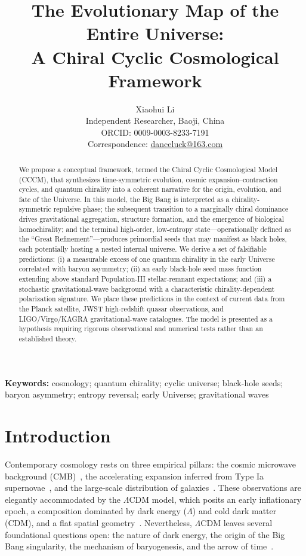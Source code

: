 \documentclass[a4paper,11pt]{article}
\title{\bfseries The Evolutionary Map of the Entire Universe:\\
A Chiral Cyclic Cosmological Framework}
\author{
    Xiaohui Li\\
    \small Independent Researcher, Baoji, China\\
    \small ORCID: 0009-0003-8233-7191\\
    \small Correspondence: \href{mailto:danceluck@163.com}{danceluck@163.com}
}
\date{}
\newcommand{\LCDM}{$\Lambda$CDM}
\newcommand{\CCCM}{CCCM}
\begin{document}
\maketitle

\begin{abstract}
\noindent
We propose a conceptual framework, termed the Chiral Cyclic Cosmological Model (\CCCM), that synthesizes time-symmetric evolution, cosmic expansion--contraction cycles, and quantum chirality into a coherent narrative for the origin, evolution, and fate of the Universe. In this model, the Big Bang is interpreted as a chirality-symmetric repulsive phase; the subsequent transition to a marginally chiral dominance drives gravitational aggregation, structure formation, and the emergence of biological homochirality; and the terminal high-order, low-entropy state---operationally defined as the ``Great Refinement''---produces primordial seeds that may manifest as black holes, each potentially hosting a nested internal universe. We derive a set of falsifiable predictions: (i) a measurable excess of one quantum chirality in the early Universe correlated with baryon asymmetry; (ii) an early black-hole seed mass function extending above standard Population-III stellar-remnant expectations; and (iii) a stochastic gravitational-wave background with a characteristic chirality-dependent polarization signature. We place these predictions in the context of current data from the Planck satellite, JWST high-redshift quasar observations, and LIGO/Virgo/KAGRA gravitational-wave catalogues. The model is presented as a hypothesis requiring rigorous observational and numerical tests rather than an established theory.
\end{abstract}

\noindent\textbf{Keywords:} cosmology; quantum chirality; cyclic universe; black-hole seeds; baryon asymmetry; entropy reversal; early Universe; gravitational waves

\section{Introduction}
\label{sec:intro}

Contemporary cosmology rests on three empirical pillars: the cosmic microwave background (CMB)~\cite{Planck2018}, the accelerating expansion inferred from Type Ia supernovae~\cite{Riess1998}, and the large-scale distribution of galaxies~\cite{Abazajian2005}. These observations are elegantly accommodated by the \LCDM{} model, which posits an early inflationary epoch, a composition dominated by dark energy ($\Lambda$) and cold dark matter (CDM), and a flat spatial geometry~\cite{Peebles2020}. Nevertheless, \LCDM{} leaves several foundational questions open: the nature of dark energy, the origin of the Big Bang singularity, the mechanism of baryogenesis, and the arrow of time~\cite{Carroll2010}.
\end{document}
